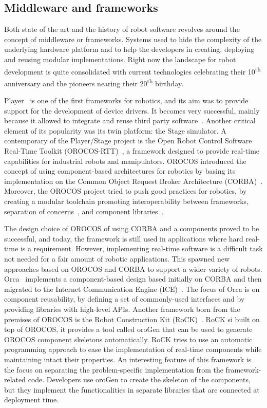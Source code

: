 \subsection{Middleware and frameworks}
Both state of the art and the history of robot software revolves around the concept of middleware or frameworks. Systems used to hide the complexity of the underlying hardware platform and to help the developers in creating, deploying and reusing modular implementations. Right now the landscape for robot development is quite consolidated with current technologies celebrating their 10\textsuperscript{th} anniversary and the pioneers nearing their 20\textsuperscript{th} birthday.

Player~\cite{gerkey2003player} is one of the first frameworks for robotics, and its aim was to provide support for the development of device drivers. It becomes very successful, mainly because it allowed to integrate and reuse third party software~\cite{vaughan2007reusable}. Another critical element of its popularity was its twin platform: the Stage simulator. A contemporary of the Player/Stage project is the Open Robot Control Software Real-Time Toolkit (OROCOS-RTT)~\cite{bruyninckx2001open}, a framework designed to provide real-time capabilities for industrial robots and manipulators. OROCOS introduced the concept of using component-based architectures for robotics by basing its implementation on the Common Object Request Broker Architecture (CORBA)~\cite{otte1996understanding}. Moreover, the OROCOS project tried to push good practices for robotics, by creating a modular toolchain promoting interoperability between frameworks, separation of concerns~\cite{bruyninckx2003real}, and component libraries~\cite{bruyninckx2002orocos}.

The design choice of OROCOS of using CORBA and a components proved to be successful, and today, the framework is still used in applications where hard real-time is a requirement. However, implementing real-time software is a difficult task not needed for a fair amount of robotic applications. This spawned new approaches based on OROCOS and CORBA to support a wider variety of robots. Orca~\cite{brooks2007orca} implements a component-based design based initially on CORBA and then migrated to the Internet Communication Engine (ICE)~\cite{ICE}. The focus of Orca is on component reusability, by defining a set of commonly-used interfaces and by providing libraries with high-level APIs. Another framework born from the premises of OROCOS is the Robot Construction Kit (RoCK)~\cite{joyeux2011robot}. RoCK si built on top of OROCOS, it provides a tool called oroGen that can be used to generate OROCOS component skeletons automatically. RoCK tries to use an automatic programming approach to ease the implementation of real-time components while maintaining intact their properties. An interesting feature of this framework is the focus on separating the problem-specific implementation from the framework-related code. Developers use oroGen to create the skeleton of the components, but they implement the functionalities in separate libraries that are connected at deployment time.

